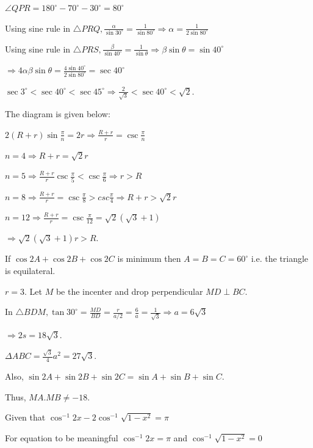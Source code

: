   $\angle QPR = 180^\circ - 70^\circ - 30^\circ = 80^\circ$

  Using sine rule in $\triangle PRQ, \frac{\alpha}{\sin30^\circ} = \frac{1}{\sin80^\circ}\Rightarrow \alpha
  = \frac{1}{2\sin80^\circ}$

  Using sine rule in $\triangle PRS, \frac{\beta}{\sin40^\circ}
  = \frac{1}{\sin\theta}\Rightarrow \beta\sin\theta = \sin40^\circ$

  $\Rightarrow 4\alpha\beta\sin\theta = \frac{4\sin40^\circ}{2\sin80^\circ} = \sec40^\circ$

  $\sec3^\circ < \sec 40^\circ < \sec45^\circ \Rightarrow \frac{2}{\sqrt{3}} < \sec40^\circ < \sqrt{2}$.
\item The diagram is given below:

  \startplacefigure
    \externalfigure[17_30.pdf]
  \stopplacefigure

  $2(R + r)\sin\frac{\pi}{n} = 2r \Rightarrow \frac{R + r}{r} = \csc\frac{\pi}{n}$

  $n = 4\Rightarrow R + r = \sqrt{2}r$

  $n = 5\Rightarrow \frac{R + r}{r}\csc\frac{\pi}{5} < \csc\frac{\pi}{6}\Rightarrow r > R$

  $n = 8\Rightarrow \frac{R + r}{r} = \csc\frac{\pi}{8} > csc\frac{\pi}{4}\Rightarrow R + r > \sqrt{2}r$

  $n = 12\Rightarrow \frac{R + r}{r} = \csc\frac{\pi}{12} = \sqrt{2}\left(\sqrt{3} + 1\right)$

  $\Rightarrow \sqrt{2}\left(\sqrt{3} + 1\right)r > R$.
\item If $\cos2A + \cos2B + \cos2C$ is minimum then $A = B = C = 60^\circ$ i.e. the triangle is equilateral.

  $r = 3$. Let $M$ be the incenter and drop perpendicular $MD\perp BC$.

  In $\triangle BDM, \tan30^\circ = \frac{MD}{BD} = \frac{r}{a/2} = \frac{6}{a}
  = \frac{1}{\sqrt{3}}\Rightarrow a = 6\sqrt{3}$

  $\Rightarrow 2s = 18\sqrt{3}$.

  $\Delta ABC = \frac{\sqrt{3}}{4}a^2 = 27\sqrt{3}$.

  Also, $\sin2A + \sin2B + \sin2C = \sin A + \sin B + \sin C$.

  Thus, $MA.MB \ne -18$.
\item Given that $\cos^{-1}2x - 2\cos^{-1}\sqrt{1 - x^2} = \pi$

  For equation to be meaningful $\cos^{-1}2x = \pi$ and $\cos^{-1}\sqrt{1 - x^2} = 0$

